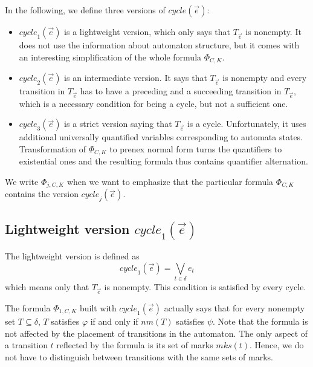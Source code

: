\documentclass[a4paper,UKenglish,cleveref, autoref, thm-restate]{lipics-v2021}
\newcommand{\mks}{\mathit{mks}}
\newcommand{\rem}{\mathit{nm}}
\newcommand{\mcycle}{\mathit{cycle}}
\newcommand{\Te}{T_{\vec{e}}}
\begin{document}
In the following, we define three versions of $\mcycle(\vec{e})$:
\begin{itemize}
\item $\mcycle_1(\vec{e})$ is a lightweight version, which only says
  that $\Te$ is nonempty. It does not use the information about
  automaton structure, but it comes with an interesting simplification
  of the whole formula $\Phi_{C,K}$.
\item $\mcycle_2(\vec{e})$ is an intermediate version. It says that $\Te$
  is nonempty and every transition in $\Te$ has to have a preceding
  and a succeeding transition in $\Te$, which is a necessary condition
  for being a cycle, but not a sufficient one.
\item $\mcycle_3(\vec{e})$ is a strict version saying that $\Te$ is a
  cycle. Unfortunately, it uses additional universally quantified
  variables corresponding to automata states. Transformation of
  $\Phi_{C,K}$ to prenex normal form turns the quantifiers to
  existential ones and the resulting formula thus contains quantifier
  alternation.
\end{itemize}
We write $\Phi_{j,C,K}$ when we want to emphasize that the particular
formula $\Phi_{C,K}$ contains the version $\mcycle_j(\vec{e})$.

\subsection{Lightweight version $\mcycle_1(\vec{e})$}
The lightweight version is defined as
\[
  \mcycle_1(\vec{e})=\bigvee_{t\in\delta}e_t
\]
which means only that $\Te$ is nonempty. This condition is satisfied by
every cycle.

The formula $\Phi_{1,C,K}$ built with $\mcycle_1(\vec{e})$ actually
says that for every nonempty set $T\subseteq\delta$, $T$ satisfies
$\varphi$ if and only if $\rem(T)$ satisfies $\psi$. Note that the
formula is not affected by the placement of transitions in the
automaton. The only aspect of a transition $t$ reflected by the
formula is its set of marks $\mks(t)$. Hence, we do not have to
distinguish between transitions with the same sets of marks.
\end{document}
